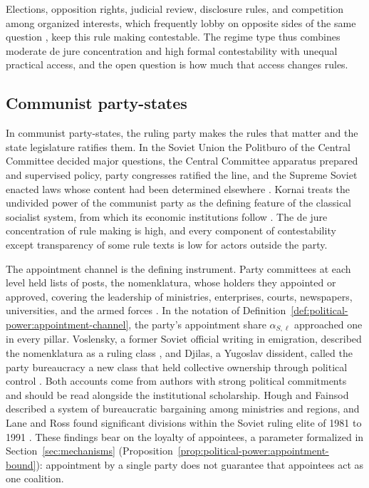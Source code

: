 \documentclass[11pt,letterpaper]{article}
\theoremstyle{definition}
\theoremstyle{remark}
\begin{document}
Elections, opposition rights, judicial review, disclosure rules, and competition among organized interests, which frequently lobby on opposite sides of the same question \citep{baumgartner2009}, keep this rule making contestable. The regime type thus combines moderate de jure concentration and high formal contestability with unequal practical access, and the open question is how much that access changes rules.

\subsection{Communist party-states}

In communist party-states, the ruling party makes the rules that matter and the state legislature ratifies them. In the Soviet Union the Politburo of the Central Committee decided major questions, the Central Committee apparatus prepared and supervised policy, party congresses ratified the line, and the Supreme Soviet enacted laws whose content had been determined elsewhere \citep{fainsod1953,hough1979}. Kornai treats the undivided power of the communist party as the defining feature of the classical socialist system, from which its economic institutions follow \citep{kornai1992}. The de jure concentration of rule making is high, and every component of contestability except transparency of some rule texts is low for actors outside the party.

The appointment channel is the defining instrument. Party committees at each level held lists of posts, the nomenklatura, whose holders they appointed or approved, covering the leadership of ministries, enterprises, courts, newspapers, universities, and the armed forces \citep{hough1979}. In the notation of Definition~\ref{def:political-power:appointment-channel}, the party's appointment share $\alpha_{S,\ell}$ approached one in every pillar. Voslensky, a former Soviet official writing in emigration, described the nomenklatura as a ruling class \citep{voslensky1984}, and Djilas, a Yugoslav dissident, called the party bureaucracy a new class that held collective ownership through political control \citep{djilas1957}. Both accounts come from authors with strong political commitments and should be read alongside the institutional scholarship. Hough and Fainsod described a system of bureaucratic bargaining among ministries and regions, and Lane and Ross found significant divisions within the Soviet ruling elite of 1981 to 1991 \citep{lane1995}. These findings bear on the loyalty of appointees, a parameter formalized in Section~\ref{sec:mechanisms} (Proposition~\ref{prop:political-power:appointment-bound}): appointment by a single party does not guarantee that appointees act as one coalition.
\end{document}
